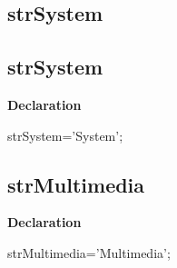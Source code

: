 \documentclass{report}
\newif\ifpdf
\begin{document}
\subsection*{\large{\textbf{strSystem}}\normalsize\hspace{1ex}\hrulefill}
\else
\subsection*{strSystem}
\fi
\label{trstrings-strSystem}
\begin{list}{}{
\setlength{\itemindent}{0cm}
\setlength{\listparindent}{0cm}
\setlength{\leftmargin}{\evensidemargin}
\addtolength{\leftmargin}{\tmplength}
\settowidth{\labelsep}{X}
\addtolength{\leftmargin}{\labelsep}
\setlength{\labelwidth}{\tmplength}
}
\item[\textbf{Declaration}\hfill]
\ifpdf
\begin{flushleft}
\fi
\begin{ttfamily}
strSystem='System';\end{ttfamily}

\ifpdf
\end{flushleft}
\fi

\end{list}
\ifpdf
\subsection*{\large{\textbf{strMultimedia}}\normalsize\hspace{1ex}\hrulefill}
\else
\subsection*{strMultimedia}
\fi
\label{trstrings-strMultimedia}
\begin{list}{}{
\setlength{\itemindent}{0cm}
\setlength{\listparindent}{0cm}
\setlength{\leftmargin}{\evensidemargin}
\addtolength{\leftmargin}{\tmplength}
\settowidth{\labelsep}{X}
\addtolength{\leftmargin}{\labelsep}
\setlength{\labelwidth}{\tmplength}
}
\item[\textbf{Declaration}\hfill]
\ifpdf
\begin{flushleft}
\fi
\begin{ttfamily}
strMultimedia='Multimedia';\end{ttfamily}

\ifpdf
\end{flushleft}
\fi

\end{list}
\ifpdf
\end{document}
